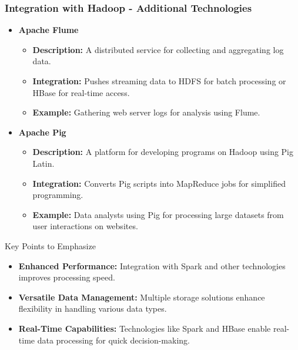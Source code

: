 \documentclass[aspectratio=169]{beamer}
\begin{document}
\begin{frame}[fragile]
    \frametitle{Integration with Hadoop - Additional Technologies}
    \begin{itemize}
        \item \textbf{Apache Flume}
        \begin{itemize}
            \item \textbf{Description:} A distributed service for collecting and aggregating log data.
            \item \textbf{Integration:} Pushes streaming data to HDFS for batch processing or HBase for real-time access.
            \item \textbf{Example:} Gathering web server logs for analysis using Flume.
        \end{itemize}

        \item \textbf{Apache Pig}
        \begin{itemize}
            \item \textbf{Description:} A platform for developing programs on Hadoop using Pig Latin.
            \item \textbf{Integration:} Converts Pig scripts into MapReduce jobs for simplified programming.
            \item \textbf{Example:} Data analysts using Pig for processing large datasets from user interactions on websites.
        \end{itemize}
    \end{itemize}

    \begin{block}{Key Points to Emphasize}
        \begin{itemize}
            \item \textbf{Enhanced Performance:} Integration with Spark and other technologies improves processing speed.
            \item \textbf{Versatile Data Management:} Multiple storage solutions enhance flexibility in handling various data types.
            \item \textbf{Real-Time Capabilities:} Technologies like Spark and HBase enable real-time data processing for quick decision-making.
        \end{itemize}
    \end{block}
\end{frame}
\end{document}
